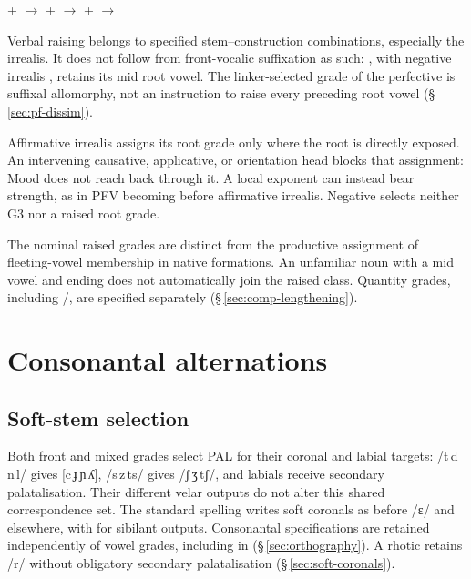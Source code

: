 \pex
\a {} +  $\rightarrow$  
\a {} +  $\rightarrow$  
\a {} +  $\rightarrow$  
\xe

Verbal raising belongs to specified stem--construction combinations, especially
the irrealis. It does not follow from front-vocalic suffixation as such:
, with negative irrealis , retains its mid root vowel.
The linker-selected  grade of the perfective is suffixal allomorphy,
not an instruction to raise every preceding root vowel
(§\,\ref{sec:pf-dissim}).

Affirmative irrealis assigns its root grade only where the root is directly
exposed. An intervening causative, applicative, or orientation head blocks that
assignment: Mood does not reach back through it. A local exponent can instead
bear strength, as in PFV  becoming  before affirmative
irrealis. Negative  selects neither G3 nor a raised root grade.

The nominal raised grades are distinct from the productive assignment
of fleeting-vowel membership in native formations. An unfamiliar noun with a
mid vowel and ending  does not automatically join the raised class.
Quantity grades, including /, are specified separately
(§\,\ref{sec:comp-lengthening}).

\section{Consonantal alternations}

\subsection{Soft-stem selection}\label{sec:front-softening}

Both front and mixed grades select PAL for their coronal and labial targets:
/t\,d\,n\,l/ gives [c\,ɟ\,ɲ\,ʎ], /s\,z\,ts/ gives /ʃ\,ʒ\,tʃ/,
and labials receive secondary palatalisation. Their different velar
outputs do not alter this shared correspondence set. The standard
spelling writes soft coronals as  before /ɛ/ and
 elsewhere, with  for sibilant outputs.
Consonantal specifications are retained independently of vowel grades,
including in 
(§\,\ref{sec:orthography}). A rhotic
retains /r/ without obligatory secondary palatalisation
(§\,\ref{sec:soft-coronals}).

